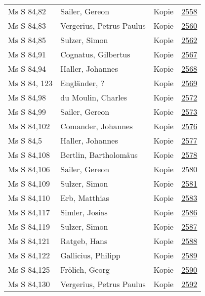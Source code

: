 \documentclass[10pt,a4paper,landscape]{report}
\begin{document}
\begin{longtable}{p{16cm}p{4cm}lr}
Ms S 84,82	&	Sailer, Gereon	&	Kopie	&	\href{http://130.60.24.72/assignment/2558}{2558}\\
Ms S 84,83	&	Vergerius, Petrus Paulus	&	Kopie	&	\href{http://130.60.24.72/assignment/2560}{2560}\\
Ms S 84,85	&	Sulzer, Simon	&	Kopie	&	\href{http://130.60.24.72/assignment/2562}{2562}\\
Ms S 84,91	&	Cognatus, Gilbertus	&	Kopie	&	\href{http://130.60.24.72/assignment/2567}{2567}\\
Ms S 84,94	&	Haller, Johannes	&	Kopie	&	\href{http://130.60.24.72/assignment/2568}{2568}\\
Ms S 84, 123	&	Engländer, ?	&	Kopie	&	\href{http://130.60.24.72/assignment/2569}{2569}\\
Ms S 84,98	&	du Moulin, Charles	&	Kopie	&	\href{http://130.60.24.72/assignment/2572}{2572}\\
Ms S 84,99	&	Sailer, Gereon	&	Kopie	&	\href{http://130.60.24.72/assignment/2573}{2573}\\
Ms S 84,102	&	Comander, Johannes	&	Kopie	&	\href{http://130.60.24.72/assignment/2576}{2576}\\
Ms S 84,5	&	Haller, Johannes	&	Kopie	&	\href{http://130.60.24.72/assignment/2577}{2577}\\
Ms S 84,108	&	Bertlin, Bartholomäus	&	Kopie	&	\href{http://130.60.24.72/assignment/2578}{2578}\\
Ms S 84,106	&	Sailer, Gereon	&	Kopie	&	\href{http://130.60.24.72/assignment/2580}{2580}\\
Ms S 84,109	&	Sulzer, Simon	&	Kopie	&	\href{http://130.60.24.72/assignment/2581}{2581}\\
Ms S 84,110	&	Erb, Matthias	&	Kopie	&	\href{http://130.60.24.72/assignment/2583}{2583}\\
Ms S 84,117	&	Simler, Josias	&	Kopie	&	\href{http://130.60.24.72/assignment/2586}{2586}\\
Ms S 84,119	&	Sulzer, Simon	&	Kopie	&	\href{http://130.60.24.72/assignment/2587}{2587}\\
Ms S 84,121	&	Ratgeb, Hans	&	Kopie	&	\href{http://130.60.24.72/assignment/2588}{2588}\\
Ms S 84,122	&	Gallicius, Philipp	&	Kopie	&	\href{http://130.60.24.72/assignment/2589}{2589}\\
Ms S 84,125	&	Frölich, Georg	&	Kopie	&	\href{http://130.60.24.72/assignment/2590}{2590}\\
Ms S 84,130	&	Vergerius, Petrus Paulus	&	Kopie	&	\href{http://130.60.24.72/assignment/2592}{2592}\\

\end{longtable}
\end{document}
